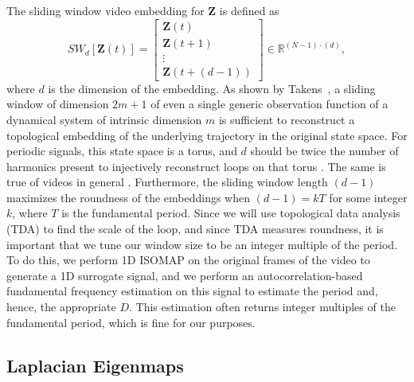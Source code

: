 \documentclass{article}
\newcommand{\mb}{\mathbf}
\begin{document}
The sliding window video embedding \cite{cao1998dynamics,traliehigh,tralie2017quasi} for $\mb{Z}$ is defined as
\begin{equation}
	SW_{d}[\mb{Z}(t)] = \left[ \begin{array}{c} \mb{Z}(t) \\ \mb{Z}(t + 1) \\ \vdots \\ \mb{Z}(t + (d-1))  \end{array} \right] \in \mathbb{R}^{(N-1)\cdot(d)},
\end{equation}
where $d$ is the dimension of the embedding. As shown by Takens~\cite{takens1981detecting}, a sliding window of dimension $2m+1$ of even a single generic observation function of a dynamical system of intrinsic dimension $m$ is sufficient to reconstruct a topological embedding of the underlying trajectory in the original state space.  For periodic signals, this state space is a torus, and $d$ should be twice the number of harmonics present to injectively reconstruct loops on that torus \cite{perea2015sliding}.  The same is true of videos in general \cite{tralie2017quasi}.  Furthermore, the sliding window length $(d-1)$ maximizes the roundness of the embeddings when $(d-1) = k T$ for some integer $k$, where $T$ is the fundamental period.  Since we will use topological data analysis (TDA) to find the scale of the loop, and since TDA measures roundness, it is important that we tune our window size to be an integer multiple of the period.  To do this, we perform 1D ISOMAP \cite{tenenbaum2000global} on the original frames of the video to generate a 1D surrogate signal, and we perform an autocorrelation-based fundamental frequency estimation \cite{Mcleod05asmarter} on this signal to estimate the period and, hence, the appropriate $D$.  This estimation often returns integer multiples of the fundamental period, which is fine for our purposes.

\subsection{Laplacian Eigenmaps}
\label{sec:laplacian}
\end{document}
